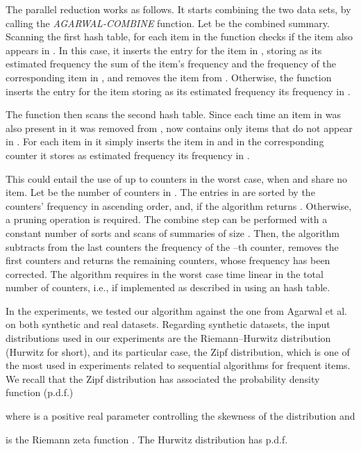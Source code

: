 \documentclass[final,3p,times]{elsarticle}
\begin{document}
The parallel reduction works as follows. It starts combining the two data sets, by calling the \textit{AGARWAL-COMBINE} function. Let  be the combined summary. Scanning the first hash table, for each item in  the function checks if the item also appears in . In this case, it inserts the entry for the item in , storing as its estimated frequency the sum of the item's frequency and the frequency of the corresponding item in , and removes the item from . Otherwise, the function inserts the entry for the item storing as its estimated frequency its frequency in . 

The function then scans the second hash table. Since each time an item in  was also present in  it was removed from , now  contains only items that do not appear in . For each item in  it simply inserts the item in  and in the corresponding counter it stores as estimated frequency its frequency in . 

 This could entail the use of up to  counters in the worst case, when  and  share no item. Let  be the number of counters in . The entries in  are sorted by the counters' frequency in ascending order, and, if  the algorithm returns . Otherwise, a pruning operation is required. The combine step can be performed with a constant number of sorts and scans of summaries of size . Then, the algorithm subtracts from the last  counters the frequency of the --th counter, removes the first  counters and returns the remaining  counters, whose frequency has been corrected. The algorithm requires in the worst case time linear in the total number of counters, i.e.,  if implemented as described in \cite{Agarwal} using an hash table. 

In the experiments, we tested our algorithm against the one from Agarwal et al. on both synthetic and real datasets. Regarding synthetic datasets, the input distributions used in our experiments are the Riemann--Hurwitz distribution (Hurwitz for short), and its particular case, the Zipf distribution, which is one of the most used in experiments related to sequential algorithms for frequent items. We recall that the Zipf distribution has associated the probability density function (p.d.f.)



\noindent where  is a positive real parameter controlling the skewness of the distribution and



\noindent is the Riemann zeta function \cite{iwaniec-kowalski}. The Hurwitz distribution has p.d.f.
\end{document}
